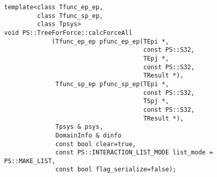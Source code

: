 \begin{screen}
\begin{verbatim}
template<class Tfunc_ep_ep,
         class Tfunc_sp_ep,
         class Tpsys>
void PS::TreeForForce::calcForceAll
             (Tfunc_ep_ep pfunc_ep_ep(TEpi *,
                                      const PS::S32,
                                      TEpj *,
                                      const PS::S32,
                                      TResult *),
              Tfunc_sp_ep pfunc_sp_ep(TEpi *,
                                      const PS::S32,
                                      TSpj *,
                                      const PS::S32,
                                      TResult *),
              Tpsys & psys,
              DomainInfo & dinfo
              const bool clear=true,
              const PS::INTERACTION_LIST_MODE list_mode = PS::MAKE_LIST,
              const bool flag_serialize=false);
\end{verbatim}
\end{screen}

